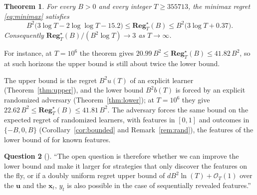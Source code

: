 \documentclass[12pt]{amsart}
\newtheorem{theorem}{Theorem}[section]
\theoremstyle{definition}
\newtheorem{question}[theorem]{Question}
\numberwithin{equation}{section}
\newcommand{\Regs}{\mathbf{Reg}^{\star}}
\newcommand{\leanmap}[1]{\ignorespaces}
\newcommand{\codemap}[1]{\ignorespaces}
\newcommand{\mapnote}[1]{\ignorespaces}
\begin{document}
\begin{theorem}\label{thm:main}
\leanmap{RegretKappa.main, RegretKappa.closedBounds, RegretKappa.chainBounds, RegretKappa.boundU_le,
  RegretKappa.kappaEqThree_squeeze, RegretKappa.mainChain}
\codemap{code/instance/bounds.gp > code/instance/out/bounds.txt}
\mapnote{Lean states the theorem as \lname{RegretKappa.MainTheorem}, with the minimax regret in the extended real numbers. It proves the two bounds (\lname{RegretKappa.closedBounds}) from $B^2b(T)\le\Regs_T(B)\le B^2u(T)$, the bounds of Theorems~\ref{thm:lower} and~\ref{thm:upper} (\lname{RegretKappa.chainBounds}), with Theorem~\ref{thm:lower}(b) for $b(T)$ and \lname{RegretKappa.boundU_le}, $u(T)\le3\log T+0.37$ for $T\ge355713$, and derives the limit from the two bounds (\lname{RegretKappa.kappaEqThree_squeeze}). \lname{RegretKappa.mainChain} states the theorem with $B^2b(T)$ and $B^2u(T)$ in place of the two bounds (\lname{RegretKappa.MainTheoremChain}). The program evaluates the instance at $T=10^6$ printed after the theorem.}
For every $B>0$ and every integer $T\ge355713$, the minimax regret \eqref{eq:minimax} satisfies
\[
B^2\bigl(3\log T-2\log\log T-15.2\bigr)\le\Regs_T(B)\le B^2\bigl(3\log T+0.37\bigr).
\]
Consequently $\Regs_T(B)/(B^2\log T)\to3$ as $T\to\infty$.
\end{theorem}

For instance, at $T=10^6$ the theorem gives $20.99\,B^2\le\Regs_T(B)\le41.82\,B^2$, so at such horizons the upper bound is still about twice the lower bound.

The upper bound is the regret $B^2u(T)$ of an explicit learner (Theorem~\ref{thm:upper}), and the lower bound $B^2b(T)$ is forced by an explicit randomized adversary (Theorem~\ref{thm:lower}); at $T=10^6$ they give $22.62\,B^2\le\Regs_T(B)\le41.81\,B^2$. The adversary forces the same bound on the expected regret of randomized learners, with features in $[0,1]$ and outcomes in $\{-B,0,B\}$ (Corollary~\ref{cor:bounded} and Remark~\ref{rem:rand}), the features of the lower bound of \citet[Theorem~4]{GaillardALT19} for known features.

\begin{question}[{\citealp[Section~4.1]{GaillardALT19}}]\label{q:GaillardALT19}
``The open question is therefore whether we can improve the lower bound and make it larger for strategies that only discover the features on the fly, or if a doubly uniform regret upper bound of $dB^2\ln(T)+\mathcal O_T(1)$ over the $\mathbf u$ and the $\mathbf x_t,\,y_t$ is also possible in the case of sequentially revealed features.''
\end{question}
\end{document}
